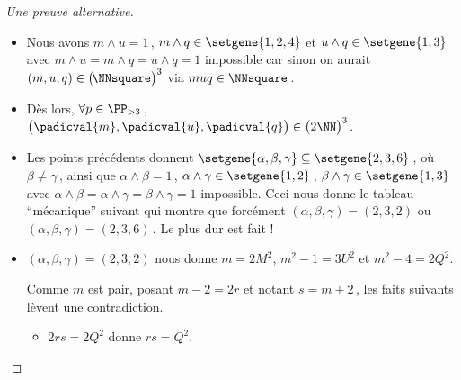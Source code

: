 \begin{proof}[Une preuve alternative]
\begin{itemize}
		\item Nous avons $m \wedge u = 1$\,, $m \wedge q \in \setgene{1, 2, 4}$ et $u \wedge q \in \setgene{1, 3}$
		avec $m \wedge u = m \wedge q = u \wedge q = 1$ impossible car sinon on aurait $(m, u, q) \in \big( \kern-1.5pt\NNsquare \big)^3$ via $muq \in \NNsquare$\,.


		\item Dès lors, $\forall p \in \PP_{>3}$\,, $\big( \padicval{m} , \padicval{u} , \padicval{q} \big) \in \big( 2 \NN \big)^3$.


		\item Les points précédents donnent 
		$\setgene{\alpha, \beta, \gamma} \subseteq \setgene{2, 3, 6}$\,,
		où $\beta \neq \gamma$\,,
		ainsi que 
		$\alpha \wedge \beta = 1$\,, $\alpha \wedge \gamma \in \setgene{1, 2}$\,, $\beta \wedge \gamma \in \setgene{1, 3}$
		avec $\alpha \wedge \beta = \alpha \wedge \gamma = \beta \wedge \gamma = 1$ impossible. 
		Ceci nous donne le tableau \enquote{mécanique} suivant qui montre que forcément $(\alpha, \beta, \gamma) = (2, 3, 2)$ ou $(\alpha, \beta, \gamma) = (2, 3, 6)$\,. Le plus dur est fait !
	\end{itemize}

	\begin{center}
	\end{center}


	\begin{itemize}
		\item $(\alpha, \beta, \gamma) = (2, 3, 2)$ nous donne $m = 2 M^2$, $m^2 - 1 = 3 U^2$ et $m^2 - 4 = 2 Q^2$.

		\noindent
		Comme $m$ est pair, posant $m - 2 = 2 r$ et notant $s = m + 2$\,, les faits suivants lèvent une contradiction.
		\begin{itemize}
			\item $2 r s = 2 Q^2$ donne $r s = Q^2$.
			

\end{itemize}
\end{itemize}
\end{proof}
